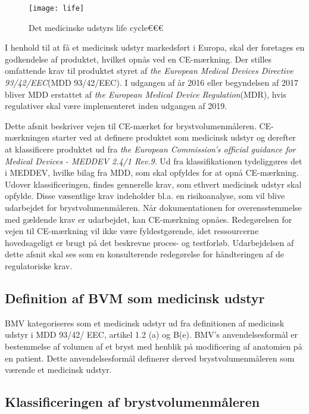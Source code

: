 \begin{figure}[htb]
\centering	
\texttt{[image: life]}
\caption{Det medicinske udstyrs life cycle€€€}
\label{fig:label}
\end{figure}

I henhold til at få et medicinsk udstyr markedsført i Europa, skal der foretages en godkendelse af produktet, hvilket opnås ved en CE-mærkning. Der stilles omfattende krav til produktet styret af \textit{the European Medical Devices Directive 93/42/EEC}{}(MDD 93/42/EEC). I udgangen af år 2016 eller begyndelsen af 2017 bliver MDD erstattet af \textit{the European Medical Device Regulation}{}(MDR), hvis regulativer skal være implementeret inden udgangen af 2019. 
  
Dette afsnit beskriver vejen til CE-mærket for brystvolumenmåleren. CE-mærkningen starter ved at definere produktet som medicinsk udstyr og derefter at klassificere produktet ud fra \textit{the European Commission's official guidance for Medical Devices - MEDDEV 2.4/1 Rev.9}. Ud fra klassifikationen tydeliggøres det i MEDDEV, hvilke bilag fra MDD, som skal opfyldes for at opnå CE-mærkning. 
Udover klassificeringen, findes gennerelle krav, som ethvert medicinsk udstyr skal opfylde. Disse væsentlige krav indeholder bl.a. en risikoanalyse, som vil blive udarbejdet for brystvolumenmåleren. 
Når dokumentationen for overensstemmelse med gældende krav er udarbejdet, kan CE-mærkning opnåes.
Redegørelsen for vejen til CE-mærkning vil ikke være fyldestgørende, idet ressourcerne hovedsageligt er brugt på det beskrevne proces- og testforløb. Udarbejdelsen af dette afsnit skal ses som en konsulterende redegørelse for håndteringen af de regulatoriske krav. 

\subsection{Definition af BVM som medicinsk udstyr}

BMV kategoriseres som et medicinsk udstyr ud fra definitionen af medicinsk udstyr i MDD 93/42/ EEC, artikel 1.2 (a) og B(e). BMV's anvendelsesformål er bestemmelse af volumen af et bryst med henblik på modificering af anatomien på en patient. Dette anvendelsesformål definerer derved brystvolumenmåleren som værende et medicinsk udstyr. 

\subsection{Klassificeringen af brystvolumenmåleren}

